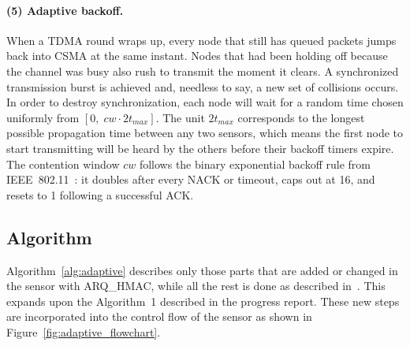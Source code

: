 \documentclass{article}
\begin{document}
\paragraph{(5) Adaptive backoff.} When a TDMA round wraps up, every node that still has queued packets jumps back into CSMA at the same instant. Nodes that had been holding off because the channel was busy also rush to transmit the moment it clears. A synchronized transmission burst is achieved and, needless to say, a new set of collisions occurs. In order to destroy synchronization, each node will wait for a random time chosen uniformly from $[0,\; cw \cdot 2t_{max}]$. The unit $2t_{max}$ corresponds to the longest possible propagation time between any two sensors, which means the first node to start transmitting will be heard by the others before their backoff timers expire. The contention window $cw$ follows the binary exponential backoff rule from IEEE~802.11~\cite{ieee80211}: it doubles after every NACK or timeout, caps out at 16, and resets to 1 following a successful ACK.

\subsection{Algorithm} \label{sec:algorithm}
Algorithm~\ref{alg:adaptive} describes only those parts that are added or changed in the sensor with ARQ\_HMAC, while all the rest is done as described in~\cite{dao2025}. This expands upon the Algorithm~1 described in the progress report. These new steps are incorporated into the control flow of the sensor as shown in Figure~\ref{fig:adaptive_flowchart}.
\end{document}
